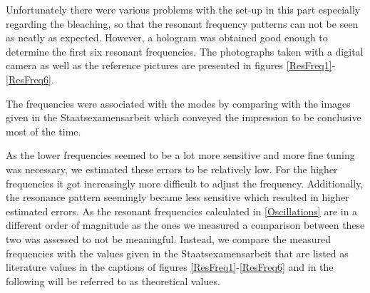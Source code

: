 Unfortunately there were various problems with the set-up in this part especially regarding the bleaching, so that the resonant frequency patterns can not be seen as neatly as expected. However, a hologram was obtained good enough to determine the first six resonant frequencies. The photographs taken with a digital camera as well as the reference pictures are presented in figures \ref{ResFreq1}-\ref{ResFreq6}.


The frequencies were associated with the modes by comparing with the images given in the Staatsexamensarbeit which conveyed the impression to be conclusive most of the time.

As the lower frequencies seemed to be a lot more sensitive and more fine tuning was necessary, we estimated these errors to be relatively low. For the higher frequencies it got increasingly more difficult to adjust the frequency. Additionally, the resonance pattern seemingly became less sensitive which resulted in higher estimated errors. 
As the resonant frequencies calculated in \ref{Oscillations} are in a different order of magnitude as the ones we measured a comparison between these two was assessed to not be meaningful. Instead, we compare the measured frequencies with the values given in the Staatsexamensarbeit that are listed as literature values in the captions of figures \ref{ResFreq1}-\ref{ResFreq6} and in the following will be referred to as theoretical values.


